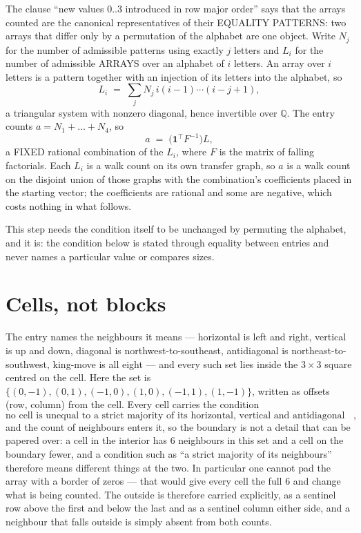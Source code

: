 \documentclass[11pt,a4paper]{article}
\theoremstyle{plain}
\theoremstyle{definition}
\begin{document}
The clause ``new values $0..3$ introduced in row major order'' says that the arrays
counted are the canonical representatives of their EQUALITY PATTERNS: two arrays that differ
only by a permutation of the alphabet are one object. Write $N_j$ for the number of admissible
patterns using exactly $j$ letters and $L_i$ for the number of admissible ARRAYS over an
alphabet of $i$ letters. An array over $i$ letters is a pattern together with an injection of
its letters into the alphabet, so
\[
L_i\;=\;\sum_{j}N_j\,i(i-1)\cdots(i-j+1),
\]
a triangular system with nonzero diagonal, hence invertible over $\mathbb{Q}$. The entry
counts $a=N_1+\dots+N_{4}$, so
\[
a\;=\;\bigl(\mathbf{1}^{\!\top}F^{-1}\bigr)L ,
\]
a FIXED rational combination of the $L_i$, where $F$ is the matrix of falling factorials.
Each $L_i$ is a walk count on its own transfer graph, so $a$ is a walk count on the disjoint
union of those graphs with the combination's coefficients placed in the starting vector; the
coefficients are rational and some are negative, which costs nothing in what follows.

This step needs the condition itself to be unchanged by permuting the alphabet, and it is:
the condition below is stated through equality between entries and never names a particular
value or compares sizes.

\section{Cells, not blocks}

The entry names the neighbours it means --- horizontal is left and right, vertical is up and
down, diagonal is northwest-to-southeast, antidiagonal is northeast-to-southwest, king-move is
all eight --- and every such set lies inside the $3\times3$ square centred on the cell. Here
the set is $\{(0,-1), (0,1), (-1,0), (1,0), (-1,1), (1,-1)\}$, written as offsets (row, column) from the cell. Every cell carries
the condition
\[
\text{no cell is unequal to a strict majority of its horizontal, vertical and antidiagonal neighbours},
\]
and the count of neighbours enters it, so the boundary is not a detail that can be papered
over: a cell in the interior has $6$ neighbours in this set and a cell on the boundary
fewer, and a condition such as ``a strict majority of its neighbours'' therefore means
different things at the two. In particular one cannot pad the array with a border of zeros ---
that would give every cell the full $6$ and change what is being counted. The outside is
therefore carried
explicitly, as a sentinel row above the first and below the last and as a sentinel column
either side, and a neighbour that falls outside is simply absent from both counts.
\end{document}
